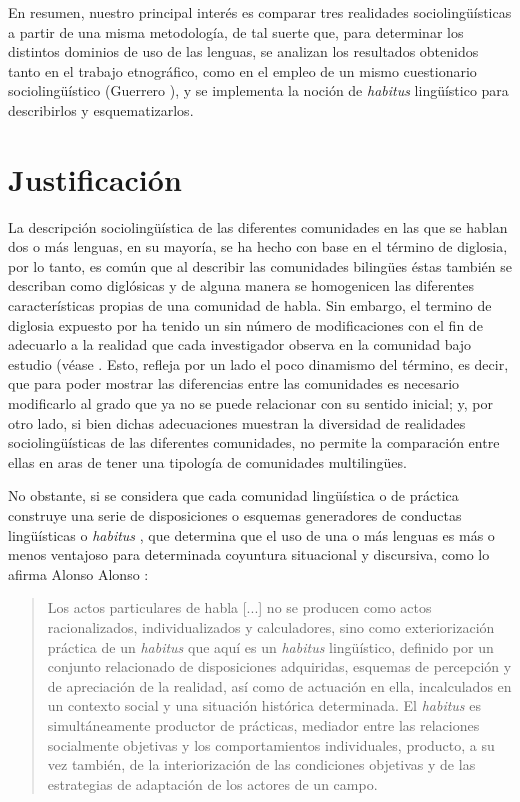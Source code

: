 \documentclass[output=paper]{../langscibook}
\begin{document}
En resumen, nuestro principal interés es comparar tres realidades sociolingüísticas a partir de una misma metodología, de tal suerte que, para determinar los distintos dominios de uso de las lenguas, se analizan los resultados obtenidos tanto en el trabajo etnográfico, como en el empleo de un mismo cuestionario sociolingüístico (Guerrero \citealt{Galván2009}), y se implementa la noción de \textit{habitus} lingüístico para describirlos y esquematizarlos.


 \section{Justificación}


La descripción sociolingüística de las diferentes comunidades en las que se hablan dos o más lenguas, en su mayoría, se ha hecho con base en el término de diglosia, por lo tanto, es común que al describir las comunidades bilingües éstas también se describan como diglósicas y de alguna manera se homogenicen las diferentes características propias de una comunidad de habla. Sin embargo, el termino de diglosia expuesto por \citet{Ferguson1959} ha tenido un sin número de modificaciones con el fin de adecuarlo a la realidad que cada investigador observa en la comunidad bajo estudio (véase \citep{Zimmermann2010}. Esto, refleja por un lado el poco dinamismo del término, es decir, que para poder mostrar las diferencias entre las comunidades es necesario modificarlo al grado que ya no se puede relacionar con su sentido inicial; y, por otro lado, si bien dichas adecuaciones muestran la diversidad de realidades sociolingüísticas de las diferentes comunidades, no permite la comparación entre ellas en aras de tener una tipología de comunidades multilingües.

  No obstante, si se considera que cada comunidad lingüística o de práctica construye una serie de disposiciones o esquemas generadores de conductas lingüísticas o \textit{habitus} \citep[114]{Bourdieu1990}, que determina que el uso de una o más lenguas es más o menos ventajoso para determinada coyuntura situacional y discursiva, como lo afirma Alonso \citet[221]{Benito2004} Alonso \citet[6]{Benito2004}:

\begin{quote}
Los actos particulares de habla [...] no se producen como actos racionalizados, individualizados y calculadores, sino como exteriorización práctica de un \textit{habitus} que aquí es un \textit{habitus} lingüístico, definido por un conjunto relacionado de disposiciones adquiridas, esquemas de percepción y de apreciación de la realidad, así como de actuación en ella, incalculados en un contexto social y una situación histórica determinada. El \textit{habitus} es simultáneamente productor de prácticas, mediador entre las relaciones socialmente objetivas y los comportamientos individuales, producto, a su vez también, de la interiorización de las condiciones objetivas y de las estrategias de adaptación de los actores de un campo.
\end{quote}
\end{document}
